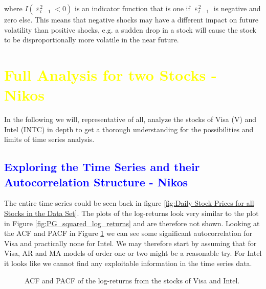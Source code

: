where $I(\upepsilon^2_{t-1} < 0)$ is an indicator function that is one if $\upepsilon^2_{t-1}$ is negative and zero else. This means that negative shocks may have a different impact on future volatility than positive shocks, e.g. a sudden drop in a stock will cause the stock to be disproportionally more volatile in the near future. 

\section{\textcolor{yellow}{Full Analysis for two Stocks  - Nikos}}
In the following we will, representative of all, analyze the stocks of Visa (V) and Intel (INTC) in depth to get a thorough understanding for the possibilities and limits of time series analysis. 

\subsection{\textcolor{blue}{Exploring the Time Series and their Autocorrelation Structure -  Nikos}}
The entire time series could be seen back in figure \ref{fig:Daily Stock Prices for all Stocks in the Data Set}. The plots of the log-returns look very similar to the plot in Figure \ref{fig:PG_squared_log_returns} and are therefore not shown. Looking at the ACF and PACF in Figure \ref{fig:INTC_V_ACF_log_returns} we can see some significant autocorrelation for Visa and practically none for Intel. We may therefore start by assuming that for Visa, AR and MA models of order one or two might be a reasonable try. For Intel it looks like we cannot find any exploitable information in the time series data. 
\begin{figure}[h!]
    \centering
    \begin{adjustbox}{width=.95\textwidth,center}
    
    \end{adjustbox}
    \begin{adjustbox}{width=.95\textwidth,center}
    
    \end{adjustbox} 
    \caption{ACF and PACF of the log-returns from the stocks of Visa and Intel.}
    \label{fig:INTC_V_ACF_log_returns}
\end{figure}{}

